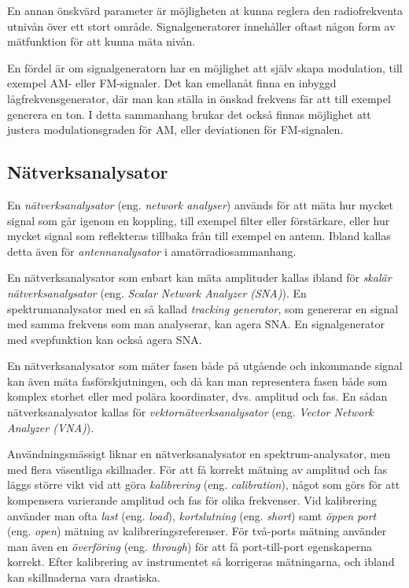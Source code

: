 En annan önskvärd parameter är möjligheten at kunna reglera den radiofrekventa
utnivån över ett stort område.
Signalgeneratorer innehåller oftast någon form av mätfunktion för att kunna
mäta nivån.

En fördel är om signalgeneratorn har en möjlighet att själv skapa modulation,
till exempel AM- eller FM-signaler.
Det kan emellanåt finna en inbyggd lågfrekvensgenerator, där man kan ställa in
önskad frekvens fär att till exempel generera en ton.
I detta sammanhang brukar det också finnas möjlighet att justera
modulationsgraden för AM, eller deviationen för FM-signalen.

\subsection{Nätverksanalysator}
\label{nätverksanalysator}
\label{network analyzer}
\label{antennanalysator}
\label{skalär nätverksanalysator}
\label{Scalar Network Analyzer (SNA)}
\label{SNA}
\label{tracking generator}
\label{vektornätverksanalysator}
\label{Vector Network Analyzer (VNA)}
\label{VNA}

En \emph{nätverksanalysator} (eng. \emph{network analyser}) används för att
mäta hur mycket signal som går igenom en koppling, till exempel filter eller
förstärkare, eller hur mycket signal som reflekteras tillbaka från till exempel en
antenn.
Ibland kallas detta även för \emph{antennanalysator} i amatörradiosammanhang.

En nätverksanalysator som enbart kan mäta amplituder kallas ibland för
\emph{skalär nätverksanalysator} (eng. \emph{Scalar Network Analyzer (SNA)}).
En spektrumanalysator med en så kallad \emph{tracking generator}, som genererar
en signal med samma frekvens som man analyserar, kan agera SNA.
En signalgenerator med svepfunktion kan också agera SNA.

En nätverksanalysator som mäter fasen både på utgående och inkommande signal
kan även mäta fasförskjutningen, och då kan man representera fasen både som
komplex storhet eller med polära koordinater, dvs. amplitud och fas.
En sådan nätverksanalysator kallas för \emph{vektornätverksanalysator} (eng.
\emph{Vector Network Analyzer (VNA)}).

Användningsmässigt liknar en nätverksanalysator en spektrum-analysator, men
med flera väsentliga skillnader.
För att få korrekt mätning av amplitud och fas läggs större vikt vid att göra
\emph{kalibrering} (eng. \emph{calibration}), något som görs för att kompensera
varierande amplitud och fas för olika frekvenser.
Vid kalibrering använder man ofta \emph{last} (eng. \emph{load}),
\emph{kortslutning} (eng. \emph{short}) samt \emph{öppen port} (eng.
\emph{open}) mätning av kalibreringsreferenser.
För två-ports mätning använder man även en \emph{överföring} (eng.
\emph{through}) för att få port-till-port egenskaperna korrekt.
Efter kalibrering av instrumentet så korrigeras mätningarna, och ibland kan
skillnaderna vara drastiska.

